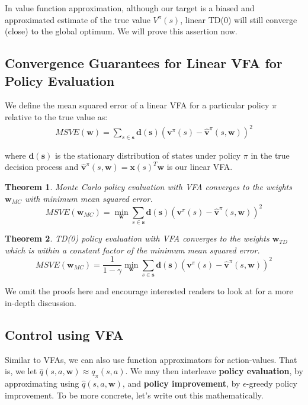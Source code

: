 \documentclass{article}
\newtheorem{theorem}{Theorem}[section]
\newcommand{\w}{\mathbf{w}}
\begin{document}
In value function approximation, although our target is a biased and approximated estimate of the true value $V^{\pi}(s)$, linear TD(0) will still converge (close) to the global optimum. We will prove this assertion now.

\subsection{Convergence Guarantees for Linear VFA for Policy Evaluation}

We define the mean squared error of a linear VFA for a particular policy $\pi$ relative to the true value as:
\begin{align*}
MSVE(\w) = \sum_{s \in \mathbf{s}} \mathbf{d} (\mathbf{s}) (\mathbf{v}^{\pi}(s) - \hat{\mathbf{v}}^{\pi} (s,\w))^2
\end{align*}

where $\mathbf{d} (\mathbf{s})$ is the stationary distribution of states under policy $\pi$ in the true decision process and $\hat{\mathbf{v}}^{\pi} (s,\w) = \mathbf{x}(s)^T \w$ is our linear VFA.

\begin{theorem}
Monte Carlo policy evaluation with VFA converges to the weights $\w_{MC}$ with minimum mean squared error.
\begin{equation*}
MSVE(\w_{MC}) = \min_{\w} \sum_{s \in \mathbf{s}} \mathbf{d} (\mathbf{s}) (\mathbf{v}^{\pi}(s) - \hat{\mathbf{v}}^{\pi} (s,\w))^2
\end{equation*}
\end{theorem}

\begin{theorem}
TD(0) policy evaluation with VFA converges to the weights $\w_{TD}$ which is within a constant factor of the minimum mean squared error.
\begin{equation*}
MSVE(\w_{MC}) = \frac{1}{1-\gamma} \min_{\w} \sum_{s \in \mathbf{s}} \mathbf{d} (\mathbf{s}) (\mathbf{v}^{\pi}(s) - \hat{\mathbf{v}}^{\pi} (s,\w))^2
\end{equation*}
\end{theorem}

We omit the proofs here and encourage interested readers to look at \cite{Tsitsiklis} for a more in-depth discussion.

\subsection{Control using VFA}

Similar to VFAs, we can also use function approximators for action-values. That is, we let $\hat{q} (s, a, \w) \approx q_{\pi} (s, a)$. We may then interleave \textbf{policy evaluation}, by approximating using $\hat{q} (s, a, \w)$, and \textbf{policy improvement}, by $\epsilon$-greedy policy improvement. To be more concrete, let's write out this mathematically.
\end{document}
